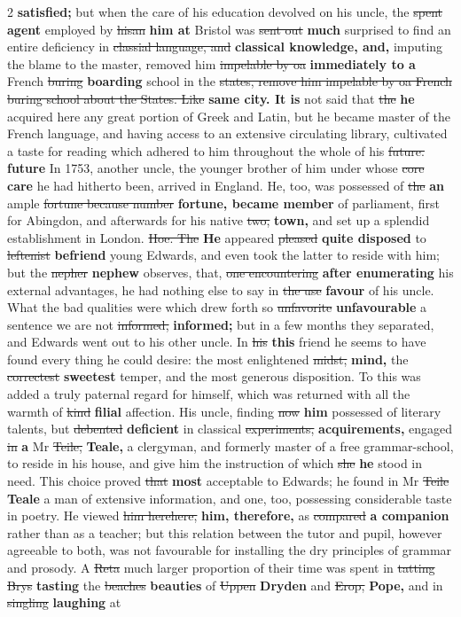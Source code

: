 \documentclass[10pt]{article}
\begin{document}
\begin{multicols}{2}
\textbf{satisfied;} but when the care of his education devolved on his uncle, the \sout{spent} \textbf{agent} employed by \sout{hisan} \textbf{him at} Bristol was \sout{sent out} \textbf{much} surprised to find an entire deficiency in \sout{classial language, and} \textbf{classical knowledge, and,} imputing the blame to the master, removed him \sout{impelable by oa} \textbf{immediately to a} French \sout{buring} \textbf{boarding} school in the \sout{states, remove him impelable by oa French buring school about the States. Like} \textbf{same city. It is} not said that \sout{the} \textbf{he} acquired here any great portion of Greek and Latin, but he became master of the French language, and having access to an extensive circulating library, cultivated a taste for reading which adhered to him throughout the whole of his \sout{future.} \textbf{future} In 1753, another uncle, the younger brother of him under whose \sout{core} \textbf{care} he had hitherto been, arrived in England. He, too, was possessed of \sout{the} \textbf{an} ample \sout{fortune because number} \textbf{fortune, became member} of parliament, first for Abingdon, and afterwards for his native \sout{two,} \textbf{town,} and set up a splendid establishment in London. \sout{Hoe. The} \textbf{He} appeared \sout{pleased} \textbf{quite disposed} to \sout{leftenist} \textbf{befriend} young Edwards, and even took the latter to reside with him; but the \sout{nepher} \textbf{nephew} observes, that, \sout{one encountering} \textbf{after enumerating} his external advantages, he had nothing else to say in \sout{the use} \textbf{favour} of his uncle. What the bad qualities were which drew forth so \sout{unfavorite} \textbf{unfavourable} a sentence we are not \sout{informed,} \textbf{informed;} but in a few months they separated, and Edwards went out to his other uncle. In \sout{his} \textbf{this} friend he seems to have found every thing he could desire: the most enlightened \sout{midst,} \textbf{mind,} the \sout{correctest} \textbf{sweetest} temper, and the most generous disposition. To this was added a truly paternal regard for himself, which was returned with all the warmth of \sout{kind} \textbf{filial} affection. His uncle, finding \sout{now} \textbf{him} possessed of literary talents, but \sout{debented} \textbf{deficient} in classical \sout{experiments,} \textbf{acquirements,} engaged \sout{in} \textbf{a} Mr \sout{Teile,} \textbf{Teale,} a clergyman, and formerly master of a free grammar-school, to reside in his house, and give him the instruction of which \sout{she} \textbf{he} stood in need. This choice proved \sout{that} \textbf{most} acceptable to Edwards; he found in Mr \sout{Teile} \textbf{Teale} a man of extensive information, and one, too, possessing considerable taste in poetry. He viewed \sout{him herehere,} \textbf{him, therefore,} as \sout{compared} \textbf{a companion} rather than as a teacher; but this relation between the tutor and pupil, however agreeable to both, was not favourable for installing the dry principles of grammar and prosody. A \sout{Reta} much larger proportion of their time was spent in \sout{tatting Brys} \textbf{tasting} the \sout{beaches} \textbf{beauties} of \sout{Uppen} \textbf{Dryden} and \sout{Erop,} \textbf{Pope,} and in \sout{singling} \textbf{laughing} at 
\end{multicols}
\end{document}
